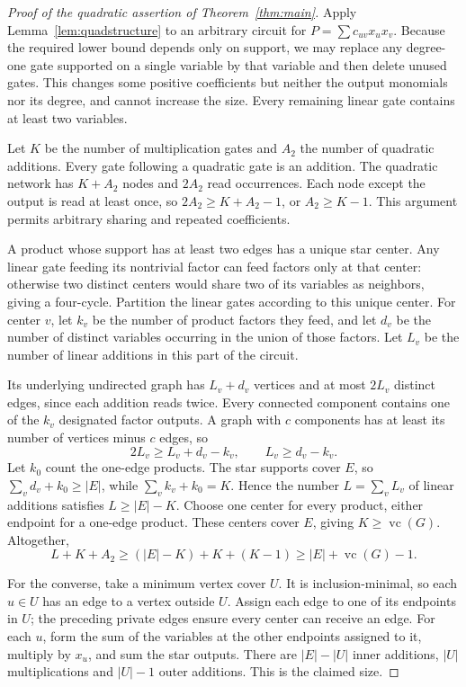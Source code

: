 \documentclass[11pt]{article}
\newcommand{\vc}{\operatorname{vc}}
\theoremstyle{definition}
\theoremstyle{remark}
\begin{document}
\begin{proof}[Proof of the quadratic assertion of Theorem~\ref{thm:main}]
Apply Lemma~\ref{lem:quadstructure} to an arbitrary circuit for $P=\sum c_{uv}x_ux_v$. Because the required lower bound depends only on support, we may replace any degree-one gate supported on a single variable by that variable and then delete unused gates. This changes some positive coefficients but neither the output monomials nor its degree, and cannot increase the size. Every remaining linear gate contains at least two variables.

Let $K$ be the number of multiplication gates and $A_2$ the number of quadratic additions. Every gate following a quadratic gate is an addition. The quadratic network has $K+A_2$ nodes and $2A_2$ read occurrences. Each node except the output is read at least once, so $2A_2\ge K+A_2-1$, or $A_2\ge K-1$. This argument permits arbitrary sharing and repeated coefficients.

A product whose support has at least two edges has a unique star center. Any linear gate feeding its nontrivial factor can feed factors only at that center: otherwise two distinct centers would share two of its variables as neighbors, giving a four-cycle. Partition the linear gates according to this unique center. For center $v$, let $k_v$ be the number of product factors they feed, and let $d_v$ be the number of distinct variables occurring in the union of those factors. Let $L_v$ be the number of linear additions in this part of the circuit.

Its underlying undirected graph has $L_v+d_v$ vertices and at most $2L_v$ distinct edges, since each addition reads twice. Every connected component contains one of the $k_v$ designated factor outputs. A graph with $c$ components has at least its number of vertices minus $c$ edges, so
\[
 2L_v\ge L_v+d_v-k_v,\qquad L_v\ge d_v-k_v.
\]
Let $k_0$ count the one-edge products. The star supports cover $E$, so $\sum_v d_v+k_0\ge|E|$, while $\sum_vk_v+k_0=K$. Hence the number $L=\sum_vL_v$ of linear additions satisfies $L\ge|E|-K$. Choose one center for every product, either endpoint for a one-edge product. These centers cover $E$, giving $K\ge\vc(G)$. Altogether,
\[
 L+K+A_2\ge (|E|-K)+K+(K-1)\ge|E|+\vc(G)-1.
\]

For the converse, take a minimum vertex cover $U$. It is inclusion-minimal, so each $u\in U$ has an edge to a vertex outside $U$. Assign each edge to one of its endpoints in $U$; the preceding private edges ensure every center can receive an edge. For each $u$, form the sum of the variables at the other endpoints assigned to it, multiply by $x_u$, and sum the star outputs. There are $|E|-|U|$ inner additions, $|U|$ multiplications and $|U|-1$ outer additions. This is the claimed size.
\end{proof}
\end{document}
